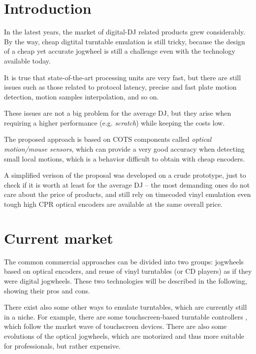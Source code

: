 \documentclass[a4paper,10pt]{article}
\begin{document}
\vspace{4ex}	%
\begin{multicols}{2}


\section{Introduction}

In the latest years, the market of digital-DJ related products grew considerably.
By the way, cheap digtital turntable emulation is still tricky, because the design
of a cheap yet accurate jogwheel is still a challenge even with the technology
available today.

It is true that state-of-the-art processing units are very fast, but there are
still issues such as those related to protocol latency, precise and fast plate
motion detection, motion samples interpolation, and so on.

These issues are not a big problem for the average DJ, but they arise when requiring
a higher performance (e.g. \emph{scratch}) while keeping the costs low.

The proposed approach is based on COTS components called \emph{optical motion/mouse
sensors}, which can provide a very good accuracy when detecting small local motions,
which is a behavior difficult to obtain with cheap encoders.

A simplified verison of the proposal was developed on a crude prototype, just to
check if it is worth at least for the average DJ -- the most demanding ones do
not care about the price of products, and still rely on timecoded vinyl emulation
even tough high CPR optical encoders are available at the same overall price.


\section{Current market}

The common commercial approaches can be divided into two groups: jogwheels based
on optical encoders, and reuse of vinyl turntables (or CD players) as if they were
digital jogwheels. These two technologies will be described in the following, showing
their pros and cons.

There exist also some other ways to emulate turntables, which are currently still
in a niche. For example, there are some touchscreen-based turntable controllers
\CITEME, which follow the market wave of touchscreen devices.
There are also some evolutions of the optical jogwheels, which are motorized \CITEME
and thus more suitable for professionals, but rather expensive.



\end{multicols}
\end{document}
